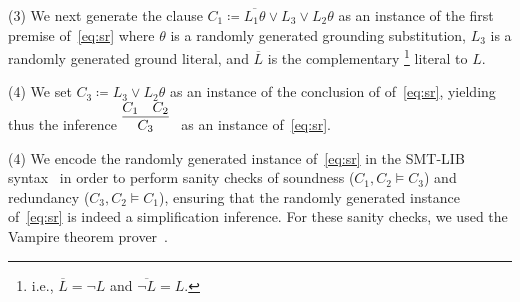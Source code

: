 
\noindent (3)  We next generate the clause $C_1 \coloneqq \overline{L_1\theta}
  \lor L_3 \lor L_2\theta$ as an instance of the first premise of~\eqref{eq:sr}
where $\theta$ is a randomly generated grounding substitution,
$L_3$ is a randomly generated ground literal,
and
$\overline{L}$ is the complementary%
\footnote{i.e., $\overline{L} = \lnot L$ and $\overline{\lnot L} = L$.}
literal to $L$.\smallskip

\noindent (4)
We set $C_3 \coloneqq L_3 \lor L_2\theta$ as an instance of the
conclusion of of~\eqref{eq:sr}, yielding thus the inference $\infer[]{
      C_3
      }{
      C_1
      &
      {C_2}}$ as an instance of~\eqref{eq:sr}.\smallskip

 



\noindent (4) We encode the randomly generated instance of~\eqref{eq:sr} 
in the SMT-LIB syntax~\cite{barrett2017smtlib} in order to perform
sanity checks of 
soundness ($C_1, C_2 \models C_3$)
and redundancy 
($C_3, C_2 \models C_1$), ensuring that the randomly
generated instance of~\eqref{eq:sr} is indeed a simplification
inference. For these sanity checks, we used the Vampire theorem
prover~\cite{Vampire13}.  %
